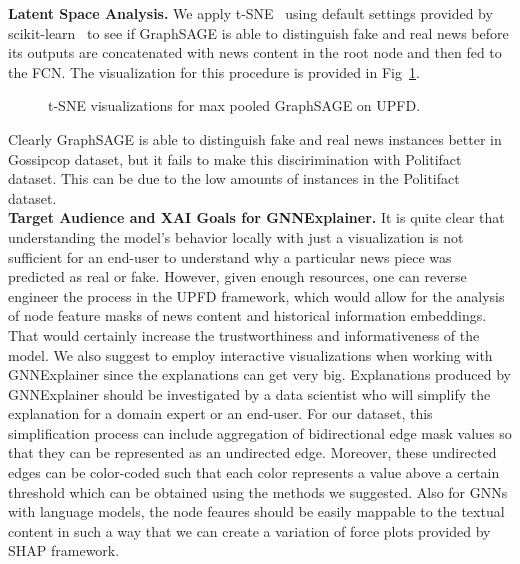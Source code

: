 \textbf{Latent Space Analysis.} We apply t-SNE~\parencite{tSNE_vanDerMaaten} using default settings provided by scikit-learn~\parencite{ScikitLearn_Pedregosa} to see if GraphSAGE is able to distinguish fake and real news before its outputs are concatenated with news content in the root node and then fed to the FCN. The visualization for this procedure is provided in Fig~\ref{fig:TSNE_GraphSAGE}.
\begin{figure}
    \centering
    \hfill
    \caption[t-SNE visualizations for GraphSAGE]{t-SNE visualizations for max pooled GraphSAGE on UPFD.}
    \label{fig:TSNE_GraphSAGE}
\end{figure}
Clearly GraphSAGE is able to distinguish fake and real news instances better in Gossipcop dataset, but it fails to make this discirimination with Politifact dataset. This can be due to the low amounts of instances in the Politifact dataset.\\
\textbf{Target Audience and XAI Goals for GNNExplainer.} It is quite clear that understanding the model's behavior locally with just a visualization is not sufficient for an end-user to understand why a particular news piece was predicted as real or fake. However, given enough resources, one can reverse engineer the process in the UPFD framework, which would allow for the analysis of node feature masks of news content and historical information embeddings. That would certainly increase the trustworthiness and informativeness of the model. We also suggest to employ interactive visualizations when working with GNNExplainer since the explanations can get very big. Explanations produced by GNNExplainer should be investigated by a data scientist who will simplify the explanation for a domain expert or an end-user. For our dataset, this simplification process can include aggregation of bidirectional edge mask values so that they can be represented as an undirected edge. Moreover, these undirected edges can be color-coded such that each color represents a value above a certain threshold which can be obtained using the methods we suggested. Also for GNNs with language models, the node feaures should be easily mappable to the textual content in such a way that we can create a variation of force plots provided by SHAP framework.\\
